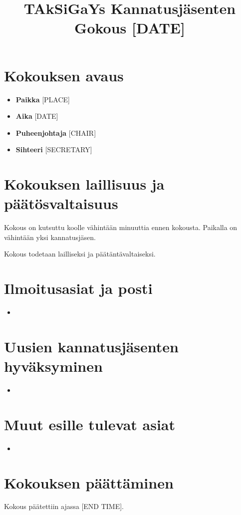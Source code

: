 \documentclass[12pt]{article}
\title{TAkSiGaYs Kannatusjäsenten Gokous [DATE]} %
\author{}
\begin{document}
\maketitle
 
\tableofcontents

\section{Kokouksen avaus}

\begin{itemize}
	\item{\textbf{Paikka} [PLACE]} %
	\item{\textbf{Aika} [DATE]} %
	\item{\textbf{Puheenjohtaja} [CHAIR]} %
	\item{\textbf{Sihteeri} [SECRETARY]} %
\end{itemize}

\section{Kokouksen laillisuus ja päätösvaltaisuus}

Kokous on kutsuttu koolle vähintään minuuttia ennen kokousta.
Paikalla on vähintään yksi kannatusjäsen.

Kokous todetaan lailliseksi ja päätäntävaltaiseksi.

\section{Ilmoitusasiat ja posti}
\begin{itemize}
	\item{}
\end{itemize}

\section{Uusien kannatusjäsenten hyväksyminen}


\begin{itemize}
	\item{}
\end{itemize}

\section{Muut esille tulevat asiat}

\begin{itemize}
	\item{}

\end{itemize}

\section{Kokouksen päättäminen}
Kokous päätettiin ajassa [END TIME]. %
\end{document}
